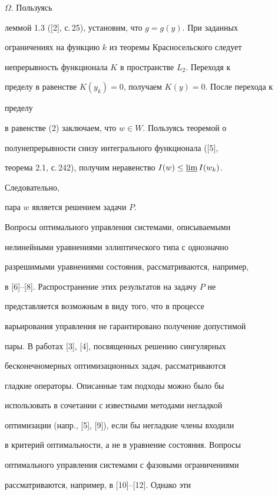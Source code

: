 \begin{pf}
$\Omega$. Пользуясь 


леммой 1.3 ([2], с.\,25), установим, что $g=g(y)$. При заданных 


ограничениях на функцию $k$ из теоремы Красносельского следует 


непрерывность функционала $K$ в пространстве $L_2$. Переходя к 


пределу в равенстве $K(y_k)=0$, получаем $K(y)=0$. После перехода к 


пределу 


в равенстве (2) заключаем, что $w\in W$. Пользуясь теоремой о 


полунепрерывности снизу интегрального функционала ([5], 


теорема 2.1, с.\,242), получим неравенство $I(w)\le\varliminf I(w_k)$. 


Следовательно, 


пара $w$ является решением задачи $P$. 


\end{pf} 


 


 


Вопросы оптимального управления системами, описываемыми 


нелинейными уравнениями эллиптического типа с однозначно 


разрешимыми уравнениями состояния, рассматриваются, например, 


в [6]--[8]. Распространение этих результатов на задачу $P$ не 


представляется возможным в виду того, что в процессе 


варьирования управления не гарантировано получение допустимой 


пары. В работах [3], [4], посвященных решению сингулярных 


бесконечномерных оптимизационных задач, рассматриваются 


гладкие операторы. Описанные там подходы можно было бы 


использовать в сочетании с известными методами негладкой 


оптимизации (напр., [5], [9]), если бы негладкие члены входили 


в критерий оптимальности, а не в уравнение состояния. Вопросы 


оптимального управления системами с фазовыми ограничениями 


рассматриваются, например, в [10]--[12]. Однако эти 


